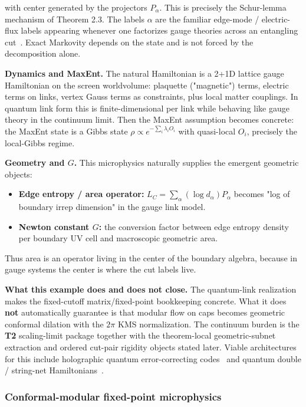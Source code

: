 with center generated by the projectors \(P_\alpha\). This is precisely the Schur-lemma mechanism of Theorem 2.3. The labels \(\alpha\) are the familiar edge-mode / electric-flux labels appearing whenever one factorizes gauge theories across an entangling cut~\cite{donnellyWall15}. Exact Markovity depends on the state and is not forced by the decomposition alone.

\textbf{Dynamics and MaxEnt.} The natural Hamiltonian is a 2+1D lattice gauge Hamiltonian on the screen worldvolume: plaquette ("magnetic") terms, electric terms on links, vertex Gauss terms as constraints, plus local matter couplings. In quantum link form this is finite-dimensional per link while behaving like gauge theory in the continuum limit. Then the MaxEnt assumption becomes concrete: the MaxEnt state is a Gibbs state \(\rho \propto e^{-\sum_i \lambda_i O_i}\) with quasi-local \(O_i\), precisely the local-Gibbs regime.

\textbf{Geometry and \(G\).} This microphysics naturally supplies the emergent geometric objects:

\begin{itemize}
\tightlist
\item
  \textbf{Edge entropy / area operator:} \(L_C = \sum_\alpha (\log d_\alpha) P_\alpha\) becomes "log of boundary irrep dimension" in the gauge link model.
\item
  \textbf{Newton constant \(G\):} the conversion factor between edge entropy density per boundary UV cell and macroscopic geometric area.
\end{itemize}

Thus area is an operator living in the center of the boundary algebra, because in gauge systems the center is where the cut labels live.

\textbf{What this example does and does not close.} The quantum-link realization makes the fixed-cutoff matrix/fixed-point bookkeeping concrete. What it does \textbf{not} automatically guarantee is that modular flow on caps becomes geometric conformal dilation with the \(2\pi\) KMS normalization. The continuum burden is the \textbf{T2} scaling-limit package together with the theorem-local geometric-subnet extraction and ordered cut-pair rigidity objects stated later. Viable architectures for this include holographic quantum error-correcting codes~\cite{pastawski15} and quantum double / string-net Hamiltonians~\cite{levinWen05}.

\subsubsection{Conformal-modular fixed-point microphysics}\label{27-conformal-modular-fixed-point-microphysics-cmfp}

